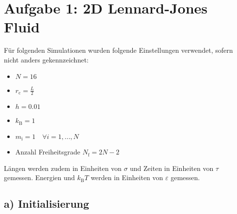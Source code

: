 \section*{Aufgabe 1: 2D Lennard-Jones Fluid}

Für folgenden Simulationen wurden folgende Einstellungen verwendet, sofern nicht anders
gekennzeichnet:
\begin{itemize}
    \item $N = 16$
    \item $r_\text{c} = \frac{L}{2}$
    \item $h = \num{0.01}$
    \item $k_\text{B} = 1$
    \item $m_\text{i} = 1 \quad \forall i = 1, ..., N$
    \item Anzahl Freiheitsgrade $N_\text{f} = 2 N - 2$
\end{itemize}
Längen werden zudem in Einheiten von $\sigma$ und Zeiten in Einheiten von $\tau$ gemessen.
Energien und $k_\text{B} T$ werden in Einheiten von $\varepsilon$ gemessen.

\subsection*{a) Initialisierung}

